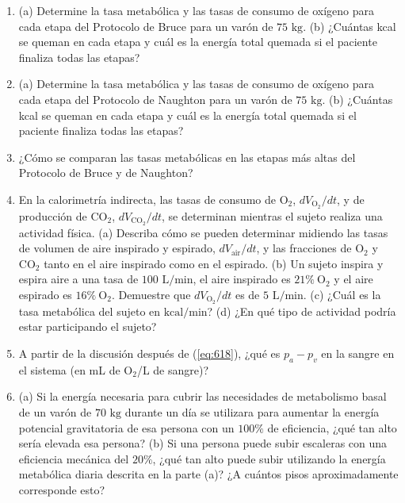 \documentclass[12pt]{book}
\begin{document}
\begin{enumerate}
\item[6.67] (a) Determine la tasa metabólica y las tasas de consumo de oxígeno para cada etapa del Protocolo de Bruce para un varón de $75\text{ kg}$. (b) ¿Cuántas kcal se queman en cada etapa y cuál es la energía total quemada si el paciente finaliza todas las etapas?

\item[6.68] (a) Determine la tasa metabólica y las tasas de consumo de oxígeno para cada etapa del Protocolo de Naughton para un varón de $75\text{ kg}$. (b) ¿Cuántas kcal se queman en cada etapa y cuál es la energía total quemada si el paciente finaliza todas las etapas?

\item[6.69] ¿Cómo se comparan las tasas metabólicas en las etapas más altas del Protocolo de Bruce y de Naughton?

\item[6.70] En la calorimetría indirecta, las tasas de consumo de $\text{O}_2$, $dV_{\text{O}_2}/dt$, y de producción de $\text{CO}_2$, $dV_{\text{CO}_2}/dt$, se determinan mientras el sujeto realiza una actividad física. (a) Describa cómo se pueden determinar midiendo las tasas de volumen de aire inspirado y espirado, $dV_{\text{air}}/dt$, y las fracciones de $\text{O}_2$ y $\text{CO}_2$ tanto en el aire inspirado como en el espirado. (b) Un sujeto inspira y espira aire a una tasa de $100\text{ L/min}$, el aire inspirado es $21\%\ \text{O}_2$ y el aire espirado es $16\%\ \text{O}_2$. Demuestre que $dV_{\text{O}_2}/dt$ es de $5\text{ L/min}$. (c) ¿Cuál es la tasa metabólica del sujeto en $\text{kcal/min}$? (d) ¿En qué tipo de actividad podría estar participando el sujeto?

\item[6.71] A partir de la discusión después de (\ref{eq:618}), ¿qué es $p_a - p_v$ en la sangre en el sistema (en mL de $\text{O}_2$/L de sangre)?

\item[6.72] (a) Si la energía necesaria para cubrir las necesidades de metabolismo basal de un varón de $70\text{ kg}$ durante un día se utilizara para aumentar la energía potencial gravitatoria de esa persona con un $100\%$ de eficiencia, ¿qué tan alto sería elevada esa persona? (b) Si una persona puede subir escaleras con una eficiencia mecánica del $20\%$, ¿qué tan alto puede subir utilizando la energía metabólica diaria descrita en la parte (a)? ¿A cuántos pisos aproximadamente corresponde esto?


\end{enumerate}
\end{document}
